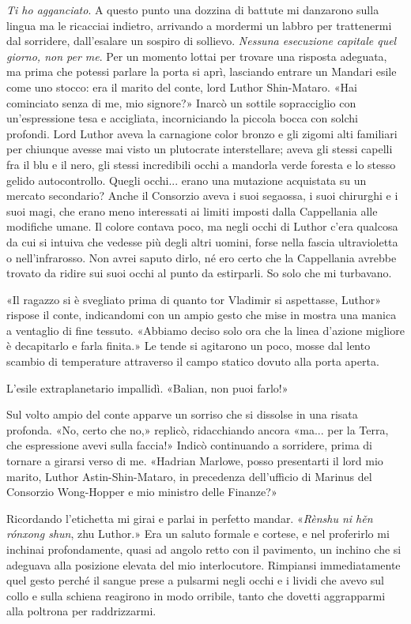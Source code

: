 \emph{Ti ho agganciato}. A questo punto una dozzina di battute mi
danzarono sulla lingua ma le ricacciai indietro, arrivando a mordermi un
labbro per trattenermi dal sorridere, dall'esalare un sospiro di
sollievo. \emph{Nessuna esecuzione capitale quel giorno, non per me}.
Per un momento lottai per trovare una risposta adeguata, ma prima che
potessi parlare la porta si aprì, lasciando entrare un Mandari esile
come uno stocco: era il marito del conte, lord Luthor Shin-Mataro. «Hai
cominciato senza di me, mio signore?» Inarcò un sottile sopracciglio con
un'espressione tesa e accigliata, incorniciando la piccola bocca con
solchi profondi. Lord Luthor aveva la carnagione color bronzo e gli
zigomi alti familiari per chiunque avesse mai visto un plutocrate
interstellare; aveva gli stessi capelli fra il blu e il nero, gli stessi
incredibili occhi a mandorla verde foresta e lo stesso gelido
autocontrollo. Quegli occhi... erano una mutazione acquistata su un
mercato secondario? Anche il Consorzio aveva i suoi segaossa, i suoi
chirurghi e i suoi magi, che erano meno interessati ai limiti imposti
dalla Cappellania alle modifiche umane. Il colore contava poco, ma negli
occhi di Luthor c'era qualcosa da cui si intuiva che vedesse più degli
altri uomini, forse nella fascia ultravioletta o nell'infrarosso. Non
avrei saputo dirlo, né ero certo che la Cappellania avrebbe trovato da
ridire sui suoi occhi al punto da estirparli. So solo che mi turbavano.

«Il ragazzo si è svegliato prima di quanto tor Vladimir si aspettasse,
Luthor» rispose il conte, indicandomi con un ampio gesto che mise in
mostra una manica a ventaglio di fine tessuto. «Abbiamo deciso solo ora
che la linea d'azione migliore è decapitarlo e farla finita.» Le tende
si agitarono un poco, mosse dal lento scambio di temperature attraverso
il campo statico dovuto alla porta aperta.

L'esile extraplanetario impallidì. «Balian, non puoi farlo!»

Sul volto ampio del conte apparve un sorriso che si dissolse in una
risata profonda. «No, certo che no,» replicò, ridacchiando ancora «ma...
per la Terra, che espressione avevi sulla faccia!» Indicò continuando a
sorridere, prima di tornare a girarsi verso di me. «Hadrian Marlowe,
posso presentarti il lord mio marito, Luthor Astin-Shin-Mataro, in
precedenza dell'ufficio di Marinus del Consorzio Wong-Hopper e mio
ministro delle Finanze?»

Ricordando l'etichetta mi girai e parlai in perfetto mandar.
«\emph{Rènshu ni hěn rónxong shun}, zhu Luthor.» Era un saluto formale e
cortese, e nel proferirlo mi inchinai profondamente, quasi ad angolo
retto con il pavimento, un inchino che si adeguava alla posizione
elevata del mio interlocutore. Rimpiansi immediatamente quel gesto
perché il sangue prese a pulsarmi negli occhi e i lividi che avevo sul
collo e sulla schiena reagirono in modo orribile, tanto che dovetti
aggrapparmi alla poltrona per raddrizzarmi.

